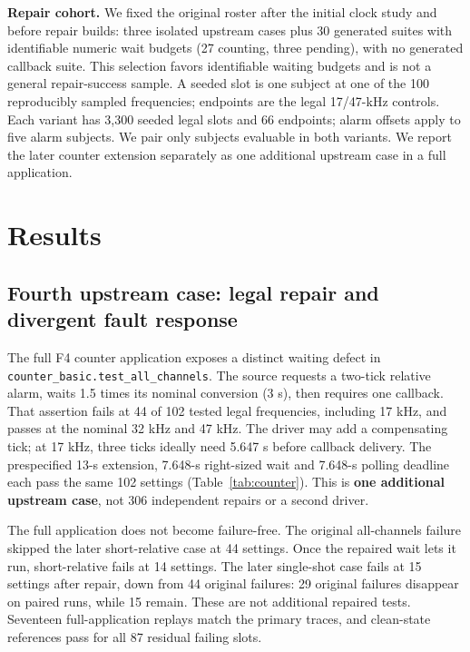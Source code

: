 \documentclass[sigconf,nonacm,balance=false]{acmart}
\begin{document}
\textbf{Repair cohort.} We fixed the original roster after the initial clock study and before repair builds: three isolated upstream cases plus 30 generated suites with identifiable numeric wait budgets (27 counting, three pending), with no generated callback suite. This selection favors identifiable waiting budgets and is not a general repair-success sample. A seeded slot is one subject at one of the 100 reproducibly sampled frequencies; endpoints are the legal 17/47-kHz controls. Each variant has 3,300 seeded legal slots and 66 endpoints; alarm offsets apply to five alarm subjects. We pair only subjects evaluable in both variants. We report the later counter extension separately as one additional upstream case in a full application.

\section{Results}
\subsection{Fourth upstream case: legal repair and divergent fault response}\label{sec:counter}
The full F4 counter application exposes a distinct waiting defect in \texttt{counter\_basic.test\_all\_channels}. The source requests a two-tick relative alarm, waits 1.5 times its nominal conversion (3 s), then requires one callback. That assertion fails at 44 of 102 tested legal frequencies, including 17 kHz, and passes at the nominal 32 kHz and 47 kHz. The driver may add a compensating tick; at 17 kHz, three ticks ideally need 5.647 s before callback delivery. The prespecified 13-s extension, 7.648-s right-sized wait and 7.648-s polling deadline each pass the same 102 settings (Table~\ref{tab:counter}). This is \textbf{one additional upstream case}, not 306 independent repairs or a second driver.

\begin{table}[t]
\caption{F4 full counter application, 102 paired legal settings per variant. Cells are pass/fail/skip counts for distinct case names; only the all-channels wait was edited.}
\label{tab:counter}\small\centering\setlength{\tabcolsep}{3pt}

\end{table}

The full application does not become failure-free. The original all-channels failure skipped the later short-relative case at 44 settings. Once the repaired wait lets it run, short-relative fails at 14 settings. The later single-shot case fails at 15 settings after repair, down from 44 original failures: 29 original failures disappear on paired runs, while 15 remain. These are not additional repaired tests. Seventeen full-application replays match the primary traces, and clean-state references pass for all 87 residual failing slots.
\end{document}
